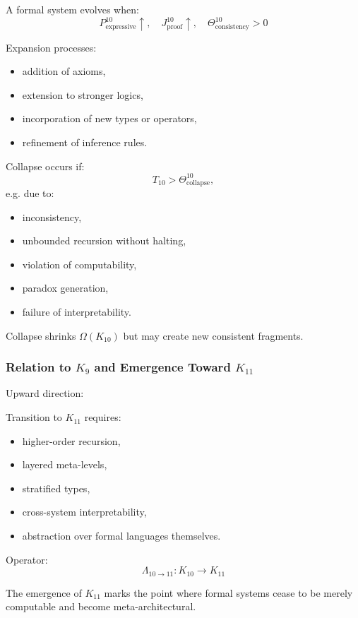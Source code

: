 A formal system evolves when:
\[
P^{10}_{\text{expressive}} \uparrow,
\quad
J^{10}_{\text{proof}} \uparrow,
\quad
\Theta^{10}_{\text{consistency}} > 0
\]

Expansion processes:
\begin{itemize}
    \item addition of axioms,
    \item extension to stronger logics,
    \item incorporation of new types or operators,
    \item refinement of inference rules.
\end{itemize}

Collapse occurs if:
\[
T_{10} > \Theta^{10}_{\text{collapse}},
\]
e.g. due to:
\begin{itemize}
    \item inconsistency,
    \item unbounded recursion without halting,
    \item violation of computability,
    \item paradox generation,
    \item failure of interpretability.
\end{itemize}

Collapse shrinks $\Omega(K_{10})$ but may create new consistent fragments.

\subsubsection{Relation to $K_{9}$ and Emergence Toward $K_{11}$}

Upward direction:

Transition to $K_{11}$ requires:
\begin{itemize}
    \item higher-order recursion,
    \item layered meta-levels,
    \item stratified types,
    \item cross-system interpretability,
    \item abstraction over formal languages themselves.
\end{itemize}

Operator:
\[
\Lambda_{10 \to 11}: K_{10} \to K_{11}
\]

The emergence of $K_{11}$ marks the point where 
formal systems cease to be merely computable 
and become meta-architectural.

